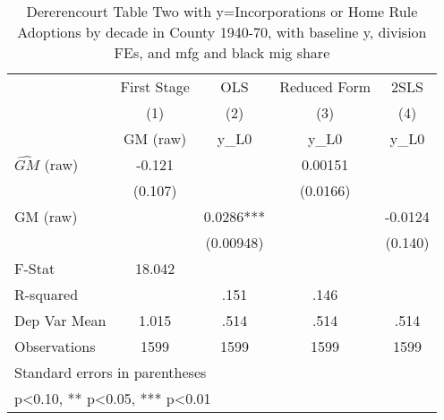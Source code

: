\begin{table}[htbp]\centering
\def\sym#1{\ifmmode^{#1}\else\(^{#1}\)\fi}
\caption{Dererencourt Table Two with y=Incorporations or Home Rule Adoptions by decade in County 1940-70, with baseline y, division FEs, and mfg and black mig share}
\begin{tabular}{l*{4}{c}}
\toprule
                    & First Stage   &         OLS   &Reduced Form   &        2SLS   \\
                    &\multicolumn{1}{c}{(1)}&\multicolumn{1}{c}{(2)}&\multicolumn{1}{c}{(3)}&\multicolumn{1}{c}{(4)}\\
                    &\multicolumn{1}{c}{GM  (raw)}&\multicolumn{1}{c}{y\_L0}&\multicolumn{1}{c}{y\_L0}&\multicolumn{1}{c}{y\_L0}\\
\midrule
$\hat{GM}$ (raw)    &      -0.121   &               &     0.00151   &               \\
                    &     (0.107)   &               &    (0.0166)   &               \\
\addlinespace
GM  (raw)           &               &      0.0286***&               &     -0.0124   \\
                    &               &   (0.00948)   &               &     (0.140)   \\
\midrule
F-Stat              &      18.042   &               &               &               \\
R-squared           &               &        .151   &        .146   &               \\
Dep Var Mean        &       1.015   &        .514   &        .514   &        .514   \\
Observations        &        1599   &        1599   &        1599   &        1599   \\
\bottomrule
\multicolumn{5}{l}{\footnotesize Standard errors in parentheses}\\
\multicolumn{5}{l}{\footnotesize * p<0.10, ** p<0.05, *** p<0.01}\\
\end{tabular}
\end{table}
